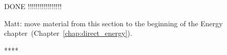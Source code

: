 DONE !!!!!!!!!!!!!!!!!

Matt: move material from this section 
to the beginning of the Energy chapter~(Chapter~\ref{chap:direct_energy}).

****

%
%
%
%

